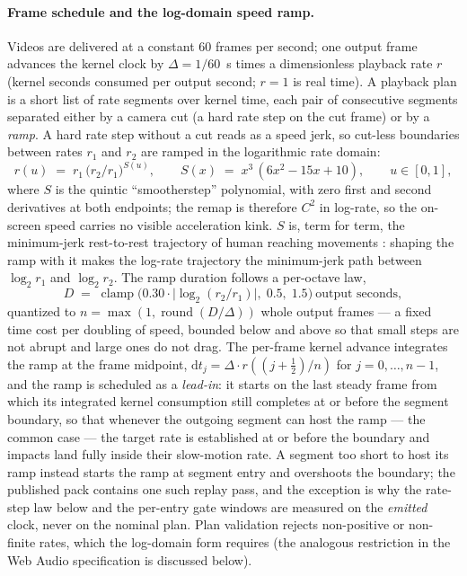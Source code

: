 \paragraph{Frame schedule and the log-domain speed ramp.}
Videos are delivered at a constant 60 frames per second; one output
frame advances the kernel clock by $\Delta = 1/60$~s times a
dimensionless playback rate $r$ (kernel seconds consumed per output
second; $r = 1$ is real time). A playback plan is a short list of rate
segments over kernel time, each pair of consecutive segments separated
either by a camera cut (a hard rate step on the cut frame) or by a
\emph{ramp}. A hard rate step without a cut reads as a speed jerk, so
cut-less boundaries between rates $r_1$ and $r_2$ are ramped in the
logarithmic rate domain:
\begin{equation}
r(u) \;=\; r_1\,\bigl(r_2/r_1\bigr)^{S(u)},
\qquad
S(x) \;=\; x^3\,(6x^2 - 15x + 10),
\qquad u \in [0,1],
\label{eq:supp-lograte}
\end{equation}
where $S$ is the quintic ``smootherstep'' polynomial, with zero first
and second derivatives at both endpoints; the remap is therefore $C^2$
in log-rate, so the on-screen speed carries no visible acceleration
kink. $S$ is, term for term, the minimum-jerk rest-to-rest trajectory of
human reaching movements \citep[eq.~(2), p.~1689]{flash1985coordination}:
shaping the ramp with it makes the log-rate trajectory the minimum-jerk
path between $\log_2 r_1$ and $\log_2 r_2$. The ramp duration follows a
per-octave law,
\begin{equation}
D \;=\; \operatorname{clamp}\bigl(0.30 \cdot \lvert \log_2 (r_2/r_1)
\rvert,\; 0.5,\; 1.5\bigr)~\text{output seconds},
\label{eq:supp-octave}
\end{equation}
quantized to $n = \max(1, \operatorname{round}(D/\Delta))$ whole output
frames --- a fixed time cost per doubling of speed, bounded below and
above so that small steps are not abrupt and large ones do not drag.
The per-frame kernel advance integrates the ramp at the frame midpoint,
$\mathrm{d}t_j = \Delta \cdot r((j + \tfrac12)/n)$ for
$j = 0,\dots,n-1$, and the ramp is scheduled as a \emph{lead-in}: it
starts on the last steady frame from which its integrated kernel
consumption still completes at or before the segment boundary, so that
whenever the outgoing segment can host the ramp --- the common case ---
the target rate is established at or before the boundary and impacts
land fully inside their slow-motion rate. A segment too short to host
its ramp instead starts the ramp at segment entry and overshoots the
boundary; the published pack contains one such replay pass, and the
exception is why the rate-step law below and the per-entry gate windows
are measured on the \emph{emitted} clock, never on the nominal plan.
Plan validation rejects
non-positive or non-finite rates, which the log-domain form requires
(the analogous restriction in the Web Audio specification is discussed
below).


